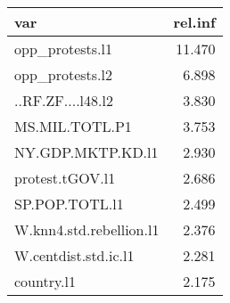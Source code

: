 \begin{tabular}{lr}
  \hline
var & rel.inf \\ 
  \hline
opp\_protests.l1 & 11.470 \\ 
  opp\_protests.l2 & 6.898 \\ 
  ..RF.ZF....l48.l2 & 3.830 \\ 
  MS.MIL.TOTL.P1 & 3.753 \\ 
  NY.GDP.MKTP.KD.l1 & 2.930 \\ 
  protest.tGOV.l1 & 2.686 \\ 
  SP.POP.TOTL.l1 & 2.499 \\ 
  W.knn4.std.rebellion.l1 & 2.376 \\ 
  W.centdist.std.ic.l1 & 2.281 \\ 
  country.l1 & 2.175 \\ 
   \hline
\end{tabular}
